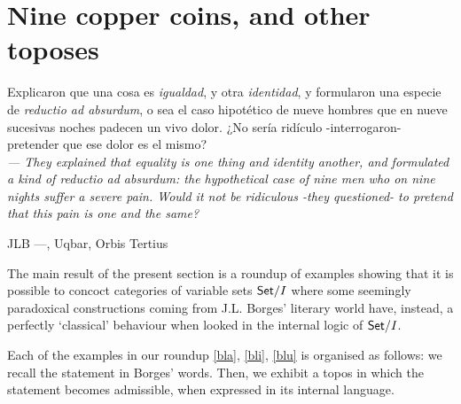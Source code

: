 \section{Nine copper coins, and other toposes}\label{sec_coins}
\epigraph{
	Explicaron que una cosa es \emph{igualdad}, y otra \emph{identidad}, y formularon una especie de \emph{reductio ad absurdum}, o sea el caso hipotético de nueve hombres que en nueve sucesivas noches padecen un vivo dolor. ¿No sería ridículo -interrogaron- pretender que ese dolor es el mismo?\\[2mm]

	\footnotesize\emph{--- They explained that \emph{equality} is one thing and
	\emph{identity} another, and formulated a kind of \emph{reductio ad absurdum}: the
	hypothetical case of nine men who on nine nights suffer a severe pain. 
	Would it not be ridiculous -they questioned- to pretend that this pain is
	one and the same? }
}{JLB ---\tlon, Uqbar, Orbis Tertius}
The main result of the present section is a roundup of examples showing that it is possible to concoct categories of variable sets $\mathsf{Set}/I$ where some seemingly paradoxical constructions coming from J.L. Borges' literary world have, instead, a perfectly `classical' behaviour when looked in the internal logic of $\mathsf{Set}/I$.

Each of the examples in our roundup \autoref{bla}, \ref{bli}, \ref{blu} is organised as follows: we recall the statement in Borges' words. Then, we exhibit a topos in which the statement becomes admissible, when expressed in its internal language.
